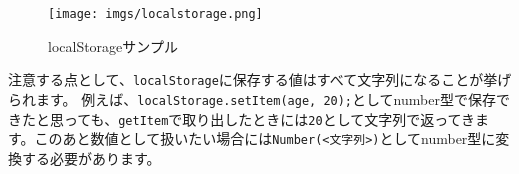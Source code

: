 \begin{Shaded}
\begin{Highlighting}[]
\NormalTok{(}\OperatorTok{,} \NormalTok{)}\OperatorTok{;}
\NormalTok{(}\NormalTok{))}\OperatorTok{;}
\NormalTok{)}\OperatorTok{;} 
\NormalTok{(}\NormalTok{)}\OperatorTok{;}

\NormalTok{(}\NormalTok{))}\OperatorTok{;} 

\NormalTok{(}\OperatorTok{,} \NormalTok{)}\OperatorTok{;}
\NormalTok{(}\OperatorTok{,} \StringTok{\textquotesingle{}20\textquotesingle{}}\NormalTok{)}\OperatorTok{;}
\NormalTok{()}\OperatorTok{;}

\NormalTok{)}\OperatorTok{;} 
\end{Highlighting}
\end{Shaded}

\begin{figure}
\centering
\texttt{[image: imgs/localstorage.png]}
\caption{localStorageサンプル}
\end{figure}

注意する点として、\texttt{localStorage}に保存する値はすべて文字列になることが挙げられます。
例えば、\texttt{localStorage.setItem(\textquotesingle{}age\textquotesingle{},\ 20);}としてnumber型で保存できたと思っても、\texttt{getItem}で取り出したときには\texttt{\textquotesingle{}20\textquotesingle{}}として文字列で返ってきます。このあと数値として扱いたい場合には\texttt{Number(\textless{}文字列\textgreater{})}としてnumber型に変換する必要があります。

